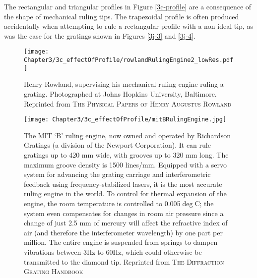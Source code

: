 The rectangular and triangular profiles in Figure \ref{3c-profile} are a consequence of the shape of mechanical ruling tips.  The trapezoidal profile is often produced accidentally when attempting to rule a rectangular profile with a non-ideal tip, as was the case for the gratings shown in Figures \ref{3j-3} and \ref{3j-4}.

\begin{figure}[htbp] %
   \centering
   \texttt{[image: Chapter3/3c\_effectOfProfile/rowlandRulingEngine2\_lowRes.pdf]}
   \caption[Henry Rowland, supervising his mechanical engine ruling a grating.]{Henry Rowland, supervising his mechanical ruling engine ruling a grating.  Photographed at Johns Hopkins University, Baltimore.  Reprinted from \textsc{The Physical Papers of Henry Augustus Rowland} \cite[page 715]{Row02}}
   \label{3c-rowlandEngine}
\end{figure}

\begin{figure}[htbp] %
   \centering
   \texttt{[image: Chapter3/3c\_effectOfProfile/mitBRulingEngine.jpg]}
   \caption[The MIT `B' ruling engine, now owned and operated by Richardson Gratings (a division of the Newport Corporation).]{The MIT `B' ruling engine, now owned and operated by Richardson Gratings (a division of the Newport Corporation).  It can rule gratings up to 420 mm wide, with grooves up to 320 mm long.  The maximum groove density is 1500 lines/mm.  Equipped with a servo system for advancing the grating carriage and interferometric feedback using frequency-stabilized lasers, it is the most accurate ruling engine in the world.  To control for thermal expansion of the engine, the room temperature is controlled to 0.005$\deg$C; the system even compensates for changes in room air pressure since a change of just 2.5 mm of mercury will affect the refractive index of air (and therefore the interferometer wavelength) by one part per million.  The entire engine is suspended from springs to dampen vibrations between 3Hz to 60Hz, which could otherwise be transmitted to the diamond tip.  Reprinted from \textsc{The Diffraction Grating Handbook} \cite{Pal05}}
   \label{3c-mitBEngine}
\end{figure}

